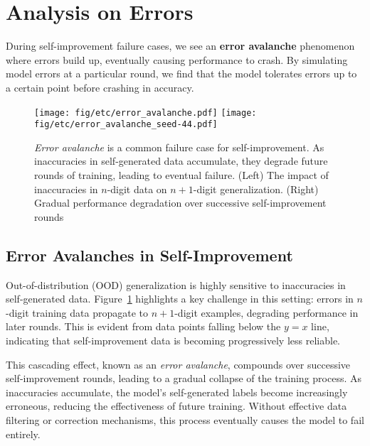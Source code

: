 

\section{Analysis on Errors}\label{sec:error_analysis}
\vspace{0.5em}
\begin{finding}
During self-improvement failure cases, we see an \textbf{error avalanche} phenomenon where errors build up, eventually causing performance to crash. By simulating model errors at a particular round, we find that the model tolerates errors up to a certain point before crashing in accuracy.
\end{finding}




\begin{figure}
    \centering
    \texttt{[image: fig/etc/error\_avalanche.pdf]}
    \hspace{1mm}
    \texttt{[image: fig/etc/error\_avalanche\_seed-44.pdf]}
    \caption{\textit{Error avalanche} is a common failure case for self-improvement. As inaccuracies in self-generated data accumulate, they degrade future rounds of training, leading to eventual failure. (Left) The impact of inaccuracies in $n$-digit data on $n+1$-digit generalization. (Right) Gradual performance degradation over successive self-improvement rounds}
    \label{fig:error_avalanche}
\end{figure}


\subsection{Error Avalanches in Self-Improvement}

Out-of-distribution (OOD) generalization is highly sensitive to inaccuracies in self-generated data. Figure~\ref{fig:error_avalanche} highlights a key challenge in this setting: errors in $n$-digit training data propagate to $n+1$-digit examples, degrading performance in later rounds. This is evident from data points falling below the $y = x$ line, indicating that self-improvement data is becoming progressively less reliable.

This cascading effect, known as an \textit{error avalanche}, compounds over successive self-improvement rounds, leading to a gradual collapse of the training process. As inaccuracies accumulate, the model's self-generated labels become increasingly erroneous, reducing the effectiveness of future training. Without effective data filtering or correction mechanisms, this process eventually causes the model to fail entirely.


